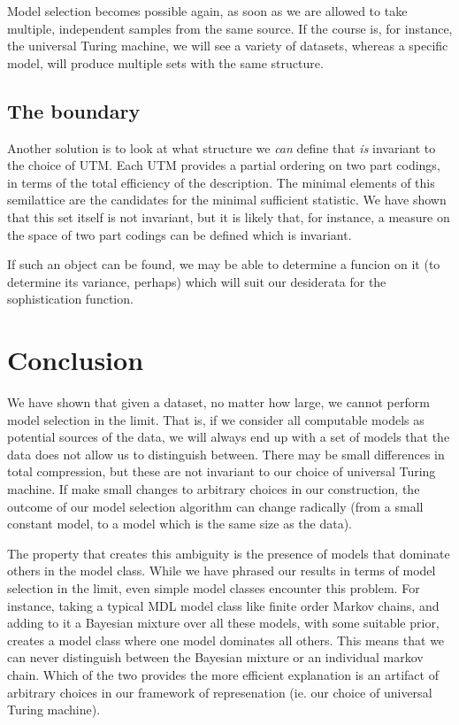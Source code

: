 \documentclass{style/llncs}
\begin{document}
Model selection becomes possible again, as soon as we are allowed to take multiple, independent samples from the same source. If the course is, for instance, the universal Turing machine, we will see a variety of datasets, whereas a specific model, will produce multiple sets with the same structure.

\subsection{The boundary}

Another solution is to look at what structure we \emph{can} define that \emph{is} invariant to the choice of UTM. Each UTM provides a partial ordering on two part codings, in terms of the total efficiency of the description. The minimal elements of this semilattice are the candidates for the minimal sufficient statistic. We have shown that this set itself is not invariant, but it is likely that, for instance, a measure on the space of two part codings can be defined which is invariant.

If such an object can be found, we may be able to determine a funcion on it (to determine its variance, perhaps) which will suit our desiderata for the sophistication function.

\section{Conclusion}

We have shown that given a dataset, no matter how large, we cannot perform model selection in the limit. That is, if we consider all computable models as potential sources of the data, we will always end up with a set of models that the data does not allow us to distinguish between. There may be small differences in total compression, but these are not invariant to our choice of universal Turing machine. If make small changes to arbitrary choices in our construction, the outcome of our model selection algorithm can change radically (from a small  constant model, to a model which is the same size as the data).

The property that creates this ambiguity is the presence of models that dominate others in the model class. While we have phrased our results in terms of model selection in the limit, even simple model classes encounter this problem. For instance, taking a typical MDL model class like finite order Markov chains, and adding to it a Bayesian mixture over all these models, with some suitable prior, creates a model class where one model dominates all others. This means that we can never distinguish between the Bayesian mixture or an individual markov chain. Which of the two provides the more efficient explanation is an artifact of arbitrary choices in our framework of represenation (ie. our choice of universal Turing machine).
\end{document}
